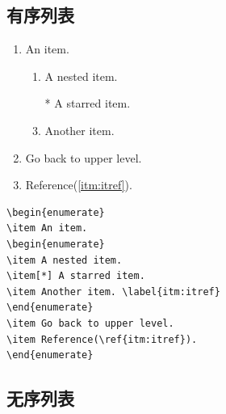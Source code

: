 \documentclass[a4paper]{article} %
\numberwithin{equation}{section} %
\begin{document}
\subsection{有序列表}
\begin{minipage}{0.5\textwidth}
\begin{enumerate}
\item An item.
\begin{enumerate}
\item A nested item.
\item[*] A starred item.
\item Another item. \label{itm:itref}
\end{enumerate}
\item Go back to upper level.
\item Reference(\ref{itm:itref}).
\end{enumerate}
\end{minipage}
\begin{minipage}{0.5\textwidth}
\begin{verbatim}
\begin{enumerate}
\item An item.
\begin{enumerate}
\item A nested item.
\item[*] A starred item.
\item Another item. \label{itm:itref}
\end{enumerate}
\item Go back to upper level.
\item Reference(\ref{itm:itref}).
\end{enumerate}
\end{verbatim}
\end{minipage}

\subsection{无序列表}
\end{document}
